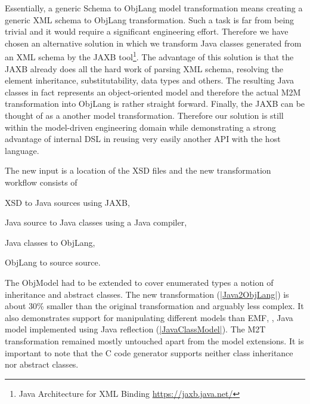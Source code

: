 \label{sec:Extension3}

\enlargethispage{20mm}

Essentially, a generic \FIXML Schema to ObjLang model transformation means creating a generic XML schema to ObjLang transformation.
Such a task is far from being trivial and it would require a significant engineering effort.
Therefore we have chosen an alternative solution in which we transform Java classes generated from an XML schema by the JAXB tool\footnote{Java Architecture for XML Binding \url{https://jaxb.java.net/}}.
The advantage of this solution is that the JAXB already does all the hard work of parsing XML schema, resolving the element inheritance, substitutability, data types and others.
The resulting Java classes in fact represents an object-oriented model and therefore the actual M2M transformation into ObjLang is rather straight forward.
Finally, the JAXB can be thought of as a another model transformation. Therefore our solution is still within the model-driven engineering domain while demonstrating a strong advantage of internal DSL in reusing very easily another API with the host language.

The new input is a location of the \FIXML XSD files and the new transformation workflow consists of 
\begin{inparaenum}[(1)]
	\item XSD to Java sources using JAXB,
	\item Java source to Java classes using a Java compiler,
	\item Java classes to ObjLang,
	\item ObjLang to source source.
\end{inparaenum}
%
The ObjModel had to be extended to cover enumerated types a notion of inheritance and abstract classes.
%
The new transformation (\href{https://github.com/fikovnik/ttc14-fixml-sigma/blob/master/ttc14-fixml-extension-3/src/fr/inria/spirals/sigma/ttc14/fixml/Java2ObjLang.scala}{\Scala|Java2ObjLang|}) is about 30\% smaller than the original transformation and arguably less complex.
It also demonstrates \SIGMA support for manipulating different models than EMF, \Ie, Java model implemented using Java reflection (\href{https://github.com/fikovnik/ttc14-fixml-sigma/blob/master/ttc14-fixml-extension-3/src/fr/inria/spirals/sigma/ttc14/fixml/javamm/JavaClassModel.scala}{\Scala|JavaClassModel|}).
The M2T transformation remained mostly untouched apart from the model extensions.
It is important to note that the C code generator supports neither class inheritance nor abstract classes.
